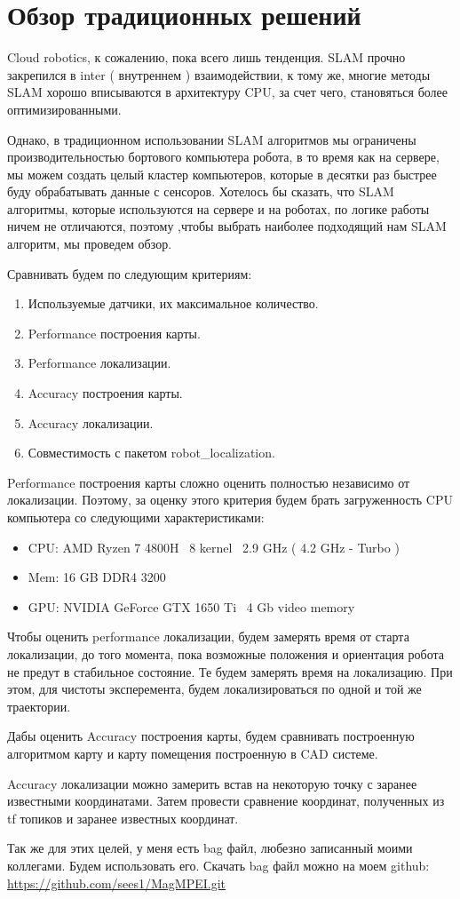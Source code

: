 \documentclass[a4paper, 14pt]{extreport}
\begin{document}
\chapter{Обзор традиционных решений}
\par Cloud robotics, к сожалению, пока всего лишь тенденция. SLAM прочно закрепился в inter ( внутреннем ) взаимодействии, к тому же, многие методы SLAM хорошо вписываются в архитектуру CPU, за счет чего, становяться более оптимизированными.
\par Однако, в традиционном использовании SLAM алгоритмов мы ограничены производительностью бортового компьютера робота, в то время как на сервере, мы можем создать целый кластер компьютеров, которые в десятки раз быстрее буду обрабатывать данные с сенсоров. Хотелось бы сказать, что SLAM алгоритмы, которые используются на сервере и на роботах, по логике работы ничем не отличаются, поэтому ,чтобы выбрать наиболее подходящий нам SLAM алгоритм, мы проведем обзор.
\par Сравнивать будем по следующим критериям:
\begin{enumerate}
        \item Используемые датчики, их максимальное количество.
        \item Performance построения карты.
        \item Performance локализации.
        \item Accuracy построения карты.
        \item Accuracy локализации.
        \item Совместимость с пакетом robot\_localization.
\end{enumerate}
\par Performance построения карты сложно оценить полностью независимо от локализации. Поэтому, за оценку этого критерия будем брать загруженность CPU компьютера со следующими характеристиками:
\begin{itemize}
        \item CPU: AMD Ryzen 7 4800H \ 8 kernel \ 2.9 GHz ( 4.2 GHz - Turbo )
        \item Mem: 16 GB DDR4 3200
        \item GPU: NVIDIA GeForce GTX 1650 Ti \ 4 Gb video memory
\end{itemize}
\par Чтобы оценить performance локализации, будем замерять время от старта локализации, до того момента, пока возможные положения и ориентация робота не предут в стабильное состояние. Те будем замерять время на локализацию. При этом, для чистоты эксперемента, будем локализироваться по одной и той же траектории.
\par Дабы оценить Accuracy построения карты, будем сравнивать построенную алгоритмом карту и карту помещения построенную в CAD системе.
\par Accuracy локализации можно замерить встав на некоторую точку с заранее известными координатами. Затем провести сравнение координат, полученных из tf топиков и заранее известных координат.
\par Так же для этих целей, у меня есть bag файл, любезно записанный моими коллегами. Будем использовать его. Скачать bag файл можно на моем github: \url{https://github.com/sees1/MagMPEI.git} 
\end{document}
